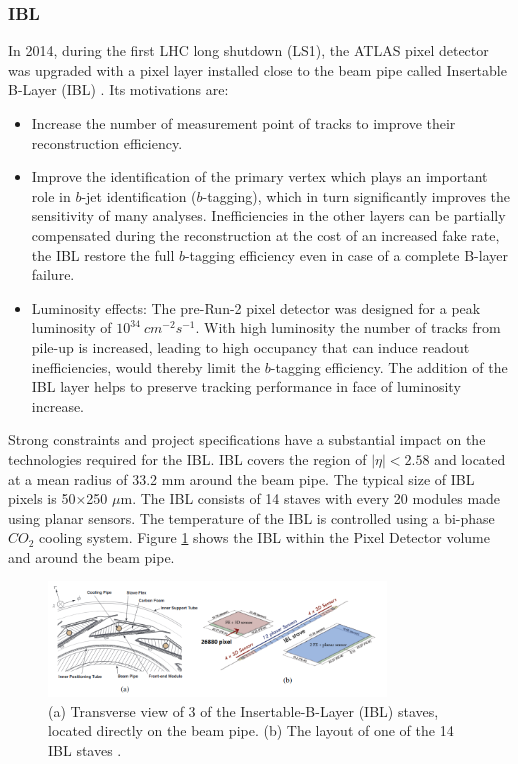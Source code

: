 \subsubsection{IBL}
\label{chap2:ATLAS:ITK:IBL}
In 2014, during the first LHC long shutdown (LS1), the ATLAS pixel detector was upgraded with a pixel layer installed close to the beam pipe called Insertable B-Layer (IBL) \cite{IBL_TDR}. Its motivations are:
\begin{itemize}
    \item Increase the number of measurement point of tracks to improve their reconstruction efficiency.
	\item Improve the identification of the primary vertex which plays an important role in $b$-jet identification ($b$-tagging), which in turn significantly improves the sensitivity of many analyses. Inefficiencies in the other layers can be partially compensated during the reconstruction at the cost of an increased fake rate, the IBL restore the full $b$-tagging efficiency even in case of a complete B-layer failure.
	\item Luminosity effects: The pre-Run-2 pixel detector was designed for a peak luminosity of $10^{34} \ cm^{-2}s^{-1}$. With high luminosity the number of tracks from pile-up is increased, leading to high occupancy that can induce readout inefficiencies, would thereby limit the $b$-tagging efficiency. The addition of the IBL layer helps to preserve tracking performance in face of luminosity increase.
\end{itemize}
Strong constraints and project specifications have a substantial impact on the technologies required for the IBL. IBL covers the region of $|\eta| < 2.58$ and located at a mean radius of 33.2 mm around the beam pipe. The typical size of IBL pixels is 50$\times$250 $\mu$m. The IBL consists of 14 staves with every 20 modules made using planar sensors. The temperature of the IBL is controlled using a bi-phase $CO_2$ cooling system. Figure \ref{fig:chap2:ATLAS:ITK:IBL} shows the IBL within the Pixel Detector volume and around the beam pipe.
\begin{figure}[htbp]
    \centering
    \includegraphics[width=0.8\textwidth]{Ch2/Img/IBL.png}
    \caption{(a) Transverse view of 3 of the Insertable-B-Layer (IBL) staves, located directly on the beam pipe. (b) The layout of one of the 14 IBL staves \cite{ID_withIBL}.}
    \label{fig:chap2:ATLAS:ITK:IBL}
\end{figure}
